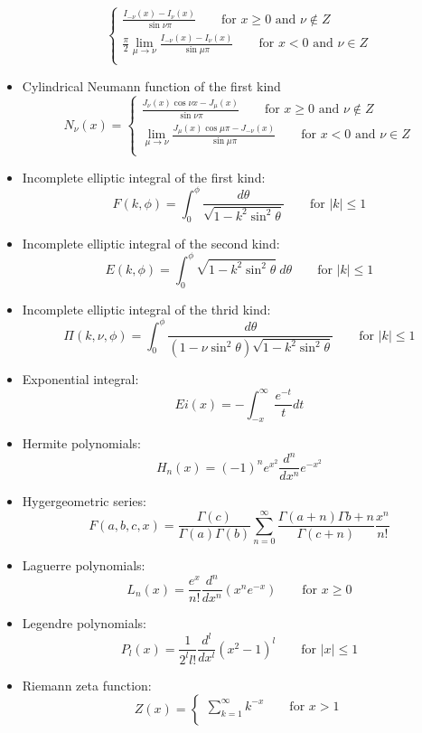 \begin{itemize}
$$\begin{cases}
		\frac{I_{-\nu}(x) - I_\nu(x)}{\sin\nu\pi}   \qquad \text{for } x\ge0 \text{ and } \nu \notin Z \\
		\displaystyle \frac{\pi}{2}\lim_{\mu\rightarrow\nu}\frac{I_{-\nu}(x) - I_\nu(x)}{\sin\mu\pi}	\qquad \text{for } x<0 \text{ and } \nu \in Z \\
	    \end{cases}
	    $$
    \item Cylindrical Neumann function of the first kind
	$$ N_\nu(x) =
	    \begin{cases}
		\frac{J_{\nu}(x)\cos\nu x - J_\mu(x)}{\sin\nu\pi} \qquad \text{for } x\ge0 \text{ and } \nu \notin Z \\
		\displaystyle \lim_{\mu\rightarrow\nu}\frac{J_{\mu}(x)\cos\mu\pi - J_{-\nu}(x)}{\sin\mu\pi} \qquad \text{for } x<0 \text{ and } \nu \in Z \\
	    \end{cases}
	    $$
	\item Incomplete elliptic integral of the first kind:
	    $$ F(k,\phi) = \int_0^{\phi}\frac{d\theta}{\sqrt{1-k^2\sin^2\theta}}	\qquad \text{for } |k| \le 1$$
	\item Incomplete elliptic integral of the second kind:
	    $$ E(k,\phi) = \int_0^{\phi}\sqrt{1-k^2\sin^2\theta}\ d\theta	\qquad \text{for } |k| \le 1$$
	\item Incomplete elliptic integral of the thrid kind:
	    $$ \Pi(k,\nu,\phi) = \int_0^{\phi}\frac{d\theta}{(1-\nu\sin^2\theta)\sqrt{1-k^2\sin^2\theta}}	\qquad \text{for } |k| \le 1$$
	\item Exponential integral:
	    $$ Ei(x) = -\int_{-x}^\infty \frac{e^{-t}}{t}dt $$
	\item Hermite polynomials:
	    $$ H_n(x) = (-1)^n e^{x^2} \frac{d^n}{dx^n}e^{-x^2} $$
	\item Hygergeometric series:
	    $$ F(a,b,c,x) = \frac{\Gamma(c)}{\Gamma(a)\Gamma(b)}\sum_{n=0}^{\infty}\frac{\Gamma(a+n)\Gamma{b+n}}{\Gamma(c+n)}\frac{x^n}{n!}$$
	\item Laguerre polynomials:
	    $$ L_n(x) = \frac{e^x}{n!} \frac{d^n}{dx^n}\left(x^n e^{-x} \right)	\qquad \text{for } x\ge 0$$
	\item Legendre polynomials:
	    $$ P_l(x) = \frac{1}{2^l l!} \frac{d^l}{dx^l}(x^2 - 1)^l	\qquad \text{for } |x| \le 1$$
	\item Riemann zeta function:
	    $$ Z(x) = 
	    \begin{cases}
		\sum_{k=1}^{\infty} k^{-x}  \qquad \text{for } x > 1\\

\end{cases}$$
\end{itemize}
